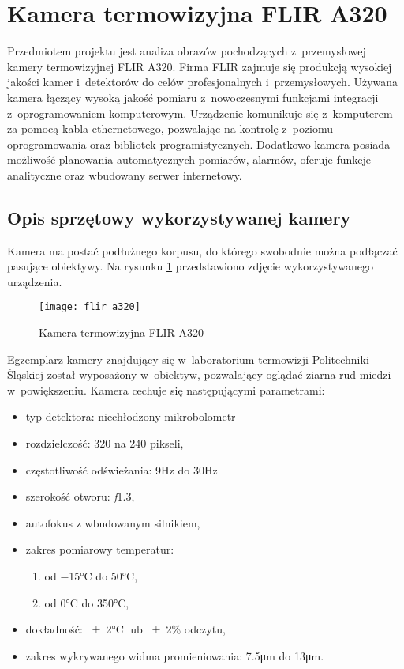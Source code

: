 \section{Kamera termowizyjna FLIR A320}
Przedmiotem projektu jest analiza obrazów pochodzących z~przemysłowej
kamery termowizyjnej FLIR A320.
Firma FLIR zajmuje się produkcją wysokiej jakości kamer i~detektorów do celów
profesjonalnych i~przemysłowych.
Używana kamera łączący wysoką jakość pomiaru z~nowoczesnymi funkcjami
integracji z~oprogramowaniem komputerowym.
Urządzenie komunikuje się z~komputerem za pomocą kabla ethernetowego,
pozwalając na kontrolę z~poziomu oprogramowania oraz bibliotek
programistycznych.
Dodatkowo kamera posiada możliwość planowania automatycznych pomiarów,
alarmów, oferuje funkcje analityczne oraz wbudowany serwer internetowy.

\subsection{Opis sprzętowy wykorzystywanej kamery}
Kamera ma postać podłużnego korpusu, do którego swobodnie można podłączać
pasujące obiektywy.
Na rysunku \ref{fig:camera} przedstawiono zdjęcie wykorzystywanego urządzenia.
\begin{figure}[htbp]
    \centering
    \texttt{[image: flir\_a320]}
    \caption{Kamera termowizyjna FLIR A320}
    \label{fig:camera}
\end{figure}
Egzemplarz kamery znajdujący się w~laboratorium termowizji Politechniki
Śląskiej został wyposażony w~obiektyw, pozwalający oglądać
ziarna rud miedzi w~powiększeniu.
Kamera cechuje się następującymi parametrami:
\begin{itemize}
	\item typ detektora: niechłodzony mikrobolometr
	\item rozdzielczość: \num{320} na \num{240} pikseli,
	\item częstotliwość odświeżania: \num{9}\si{\hertz} do \num{30}\si{\hertz}
	\item szerokość otworu: \textit{f}\num{1,3},
	\item autofokus z wbudowanym silnikiem,
	\item zakres pomiarowy temperatur: 
		\begin{enumerate}
			\item od \num{-15}\si{\celsius} do \num{+50}\si{\celsius},
			\item od \num{0}\si{\celsius} do \num{350}\si{\celsius},
		\end{enumerate}
	\item dokładność: \num{\pm2}\si{\celsius} lub \num{\pm2}\% odczytu,
	\item zakres wykrywanego widma promieniowania: \num{7,5}\si{\micro\meter}
          do \num{13}\si{\micro\meter}.
\end{itemize}

